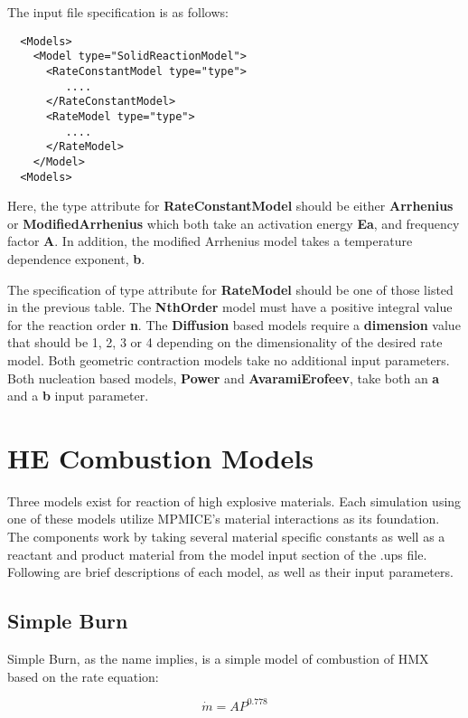 The input file specification is as follows:

\begin{verbatim}
  <Models>
    <Model type="SolidReactionModel">
      <RateConstantModel type="type">
         ....
      </RateConstantModel>
      <RateModel type="type">
         ....
      </RateModel>
    </Model>
  <Models>
\end{verbatim}

\noindent Here, the type attribute for \textbf{RateConstantModel} should be either \textbf{Arrhenius} or \textbf{ModifiedArrhenius}
which both take an activation energy \textbf{Ea}, and frequency factor \textbf{A}.  In addition, the modified Arrhenius
model takes a temperature dependence exponent, \textbf{b}.

The specification of type attribute for \textbf{RateModel} should be one of those listed in the previous table.
The \textbf{NthOrder} model must have a positive integral value for the reaction order \textbf{n}. 
The \textbf{Diffusion} based models require a \textbf{dimension} value that should be 1, 2, 3 or 4 depending
on the dimensionality of the desired rate model.  Both geometric contraction models take no additional
input parameters. Both nucleation based models, \textbf{Power} and \textbf{AvaramiErofeev}, take both 
an \textbf{a} and a \textbf{b} input parameter. 

\section{HE Combustion Models}

Three models exist for reaction of high explosive materials.  Each
simulation using one of these models utilize MPMICE's material
interactions as its foundation.  The components work by taking several
material specific constants as well as a reactant and product material
from the model input section of the .ups file.  Following are brief
descriptions of each model, as well as their input parameters.

\subsection{Simple Burn} \label{Sec:SimpleBurn}

Simple Burn, as the name implies, is a simple model of combustion of HMX based on the rate equation:

\begin{equation}
\dot{m}=A P^{0.778}
\label{simburneqn}
\end{equation}


